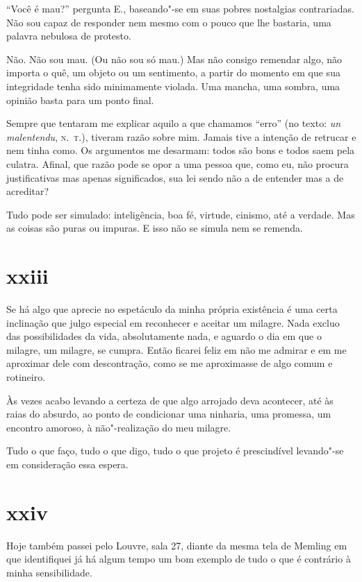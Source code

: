 ``Você é mau?'' pergunta E., baseando"-se em suas pobres nostalgias
contrariadas. Não sou capaz de responder nem mesmo com o pouco que
lhe bastaria, uma palavra nebulosa de protesto.

Não. Não sou mau. (Ou não sou só mau.) Mas não consigo remendar algo,
não importa o quê, um objeto ou um sentimento, a partir do momento em
que sua integridade tenha sido minimamente violada. Uma mancha, uma
sombra, uma opinião basta para um ponto final.

Sempre que tentaram me explicar aquilo a que chamamos ``erro'' (no
texto: \emph{un malentendu}, \textsc{n.~t.}), tiveram razão sobre mim. Jamais tive
a intenção de retrucar e nem tinha como. Os argumentos me desarmam:
todos são bons e todos saem pela culatra. Afinal, que razão pode se opor
a uma pessoa que, como eu, não procura justificativas mas apenas
significados, sua lei sendo não a de entender mas a de acreditar?

Tudo pode ser simulado: inteligência, boa fé, virtude, cinismo, até a
verdade. Mas as coisas são puras ou impuras. E isso não se simula nem
se remenda.

\section{xxiii}

Se há algo que aprecie no espetáculo da minha própria existência é
uma certa inclinação que julgo especial em reconhecer e aceitar um
milagre. Nada excluo das possibilidades da vida, absolutamente nada, e
aguardo o dia em que o milagre, um milagre, se cumpra. Então ficarei
feliz em não me admirar e em me aproximar dele com descontração, como se
me aproximasse de algo comum e rotineiro.

Às vezes acabo levando a certeza de que algo arrojado deva
acontecer, até às raias do absurdo, ao ponto de condicionar uma
ninharia, uma promessa, um encontro amoroso, à não"-realização do meu
milagre.

Tudo o que faço, tudo o que digo, tudo o que projeto é
prescindível levando"-se em consideração essa espera.

\section{xxiv}

Hoje também passei pelo Louvre, sala 27, diante da mesma tela de
Memling em que identifiquei já há algum tempo um bom exemplo de tudo o
que é contrário à minha sensibilidade.

